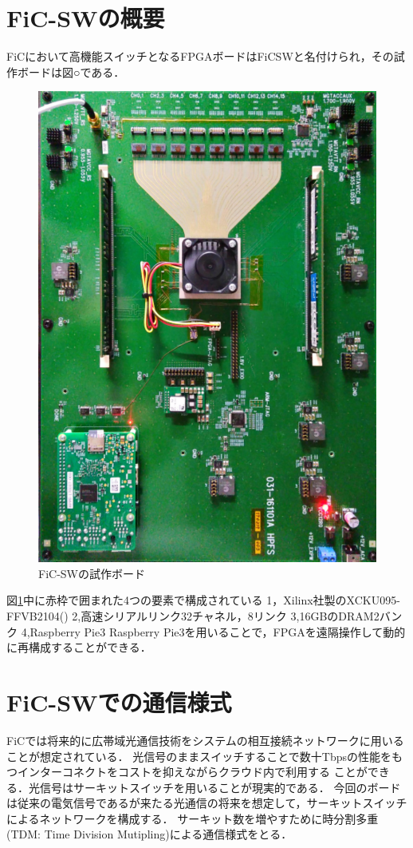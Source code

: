 {\section{FiC-SWの概要}
\label{sec:about_ficsw}
FiCにおいて高機能スイッチとなるFPGAボードはFiCSWと名付けられ，その試作ボードは図○である．
\begin{figure}[h]
  \centering
  \includegraphics[width=12cm]{./chap3/fig/ficsw.pdf}
  \caption{FiC-SWの試作ボード}
  \label{fig:ficsw}
\end{figure}
図\ref{fig:ficsw}中に赤枠で囲まれた4つの要素で構成されている
1，Xilinx社製のXCKU095-FFVB2104()
2,高速シリアルリンク32チャネル，8リンク
3,16GBのDRAM2バンク
4,Raspberry Pie3
Raspberry Pie3を用いることで，FPGAを遠隔操作して動的に再構成することができる．
\section{FiC-SWでの通信様式}
\label{sec:ficsw_communication}
FiCでは将来的に広帯域光通信技術をシステムの相互接続ネットワークに用いることが想定されている．
光信号のままスイッチすることで数十Tbpsの性能をもつインターコネクトをコストを抑えながらクラウド内で利用する
ことができる．光信号はサーキットスイッチを用いることが現実的である．
今回のボードは従来の電気信号であるが来たる光通信の将来を想定して，サーキットスイッチによるネットワークを構成する．
サーキット数を増やすために時分割多重(TDM: Time Division Mutipling)による通信様式をとる．
}
